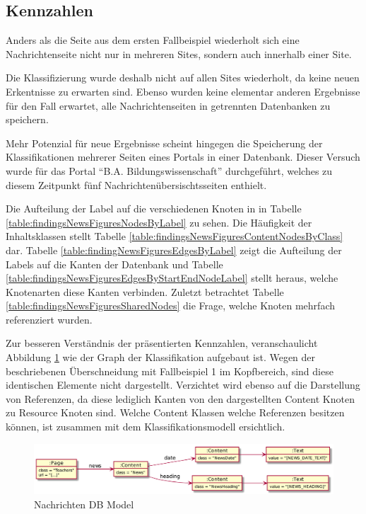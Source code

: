 \subsection{Kennzahlen}
    Anders als die Seite aus dem ersten Fallbeispiel wiederholt sich
    eine Nachrichtenseite nicht nur in mehreren Sites,
    sondern auch innerhalb einer Site.

    Die Klassifizierung wurde deshalb nicht auf allen Sites wiederholt,
    da keine neuen Erkentnisse zu erwarten sind.
    Ebenso wurden keine elementar anderen Ergebnisse für den Fall erwartet,
    alle Nachrichtenseiten in getrennten Datenbanken zu speichern.

    Mehr Potenzial für neue Ergebnisse scheint hingegen die Speicherung
    der Klassifikationen mehrerer Seiten eines Portals in einer Datenbank.
    Dieser Versuch wurde für das Portal "`B.A. Bildungswissenschaft"' durchgeführt,
    welches zu diesem Zeitpunkt fünf Nachrichtenübersischtsseiten enthielt.

    Die Aufteilung der Label auf die verschiedenen Knoten in in Tabelle
    \ref{table:findingsNewsFiguresNodesByLabel} zu sehen.
    Die Häufigkeit der Inhaltsklassen stellt Tabelle
    \ref{table:findingsNewsFiguresContentNodesByClass} dar.
    Tabelle \ref{table:findingNewsFiguresEdgesByLabel} zeigt die Aufteilung
    der Labels auf die Kanten der Datenbank und Tabelle
    \ref{table:findingsNewsFiguresEdgesByStartEndNodeLabel}
    stellt heraus, welche Knotenarten diese Kanten verbinden.
    Zuletzt betrachtet Tabelle \ref{table:findingsNewsFiguresSharedNodes}
    die Frage, welche Knoten mehrfach referenziert wurden.

    Zur besseren Verständnis der präsentierten Kennzahlen,
    veranschaulicht Abbildung
    \ref{image:findingNewsFiguresDbModel}
    wie der Graph der Klassifikation aufgebaut ist.
    Wegen der beschriebenen Überschneidung mit Fallbeispiel 1 im Kopfbereich,
    sind diese identischen Elemente nicht dargestellt.
    Verzichtet wird ebenso auf die Darstellung von Referenzen,
    da diese lediglich Kanten von den dargestellten Content Knoten
    zu Resource Knoten sind.
    Welche Content Klassen welche Referenzen besitzen können,
    ist zusammen mit dem Klassifikationsmodell ersichtlich.

    \begin{figure}[htb]
        \centering
        \includegraphics[scale=\imageScalingFactor]{../resources/findings/case-study-2/dbmodel.png}
        \caption{Nachrichten DB Model}
        \label{image:findingNewsFiguresDbModel}
    \end{figure}

